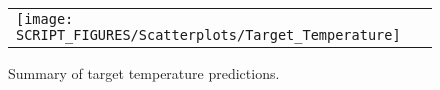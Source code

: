 \begin{figure}[!ht]
\begin{center}
\begin{tabular}{l}
\texttt{[image: SCRIPT\_FIGURES/Scatterplots/Target\_Temperature]}
\end{tabular}
\end{center}
\caption[Summary of target temperature predictions]
{Summary of target temperature predictions.}
\label{Surface_Temperature_Steel_Summary}
\end{figure}

